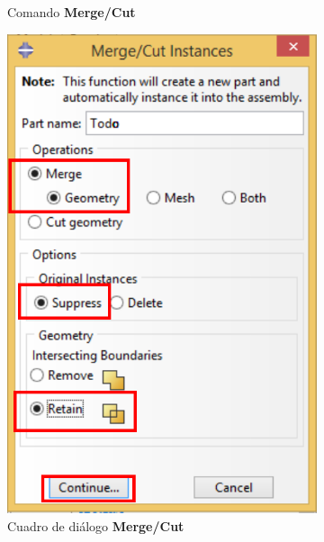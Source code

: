 \begin{itemize}
\begin{figure}[!h]
\begin{subfigure}[!h]{0.15\textwidth}
      \caption{Comando \textbf{Merge/Cut}}
      \label{ayu02r}
    \end{subfigure}%
    \begin{subfigure}[!h]{0.45\textwidth}
      \includegraphics[width=\textwidth]{./body/images/ayu04.pdf}
      \caption{Cuadro de diálogo \textbf{Merge/Cut}}
      \label{ayu04}
    \end{subfigure}%
    \begin{subfigure}[!h]{0.20\textwidth}

\end{subfigure}
\end{figure}
\end{itemize}
